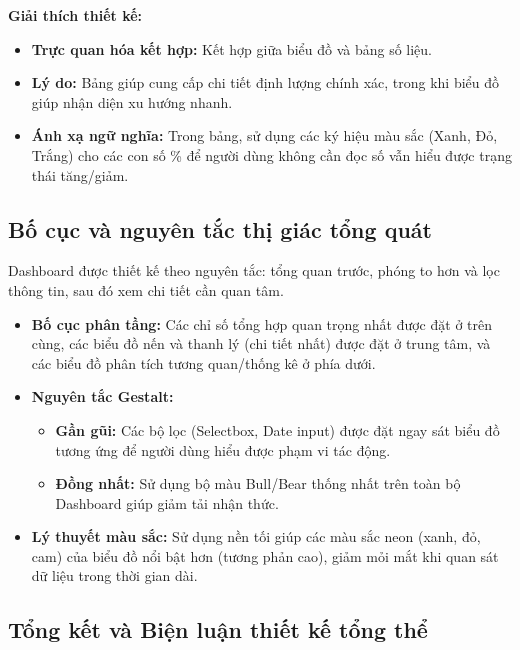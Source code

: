 \textbf{Giải thích thiết kế:}
\begin{itemize}
    \item \textbf{Trực quan hóa kết hợp:} Kết hợp giữa biểu đồ và bảng số liệu.
    \item \textbf{Lý do:} Bảng giúp cung cấp chi tiết định lượng chính xác, trong khi biểu đồ giúp nhận diện xu hướng nhanh.
    \item \textbf{Ánh xạ ngữ nghĩa:} Trong bảng, sử dụng các ký hiệu màu sắc (Xanh, Đỏ, Trắng) cho các con số \% để người dùng không cần đọc số vẫn hiểu được trạng thái tăng/giảm.
\end{itemize}

\subsection{Bố cục và nguyên tắc thị giác tổng quát}
Dashboard được thiết kế theo nguyên tắc: tổng quan trước, phóng to hơn và lọc thông tin, sau đó xem chi tiết cần quan tâm.

\begin{itemize}
    \item \textbf{Bố cục phân tầng:} Các chỉ số tổng hợp quan trọng nhất được đặt ở trên cùng, các biểu đồ nến và thanh lý (chi tiết nhất) được đặt ở trung tâm, và các biểu đồ phân tích tương quan/thống kê ở phía dưới.
    \item \textbf{Nguyên tắc Gestalt:}
    \begin{itemize}
        \item \textbf{Gần gũi:} Các bộ lọc (Selectbox, Date input) được đặt ngay sát biểu đồ tương ứng để người dùng hiểu được phạm vi tác động.
        \item \textbf{Đồng nhất:} Sử dụng bộ màu Bull/Bear thống nhất trên toàn bộ Dashboard giúp giảm tải nhận thức.
    \end{itemize}
    \item \textbf{Lý thuyết màu sắc:} Sử dụng nền tối giúp các màu sắc neon (xanh, đỏ, cam) của biểu đồ nổi bật hơn (tương phản cao), giảm mỏi mắt khi quan sát dữ liệu trong thời gian dài.
\end{itemize}

\subsection{Tổng kết và Biện luận thiết kế tổng thể}

